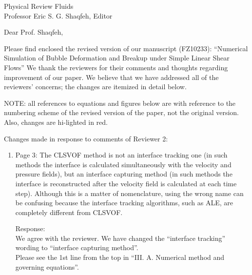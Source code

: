 \documentclass{letter}
\date{\today}
\begin{document}
\begin{letter}{
Physical Review Fluids\\
Professor Eric S. G. Shaqfeh, Editor\\}

\opening{Dear Prof. Shaqfeh,}

Please find enclosed the revised version of our manuscript (FZ10233):
``Numerical Simulation of Bubble Deformation and Breakup under Simple Linear Shear Flows''
We thank the reviewers for their comments and thoughts regarding improvement 
of our paper. We believe that we have addressed all of the reviewers’ 
concerns; the changes are itemized in detail below.


\par\noindent
NOTE: all references to equations and figures below are with
reference to the numbering scheme of the revised version of the paper,
not the original version.  Also, changes are hi-lighted in red.
\par\noindent

Changes made in response to comments of Reviewer 2: 
\begin{enumerate}
\item
\textsf
{Page 3: The CLSVOF method is not an interface tracking one (in such methods
the interface is calculated simultaneously with the velocity and pressure
fields), but an interface capturing method (in such methods the interface is
reconstructed after the velocity field is calculated at each time step).
Although this is a matter of nomenclature, using the wrong name can be
confusing because the interface tracking algorithms, such as ALE, are
completely different from CLSVOF.}
\vspace{3 mm}

Response: \\
We agree with the reviewer. We have changed the ``interface tracking''
wording to ``interface capturing method''.
\\
Please see the 1st line from the top in ``I\hspace{-1.2pt}I\hspace{-1.2pt}I. A. Numerical method and governing equations''.
\\


\end{enumerate}
\end{letter}
\end{document}
